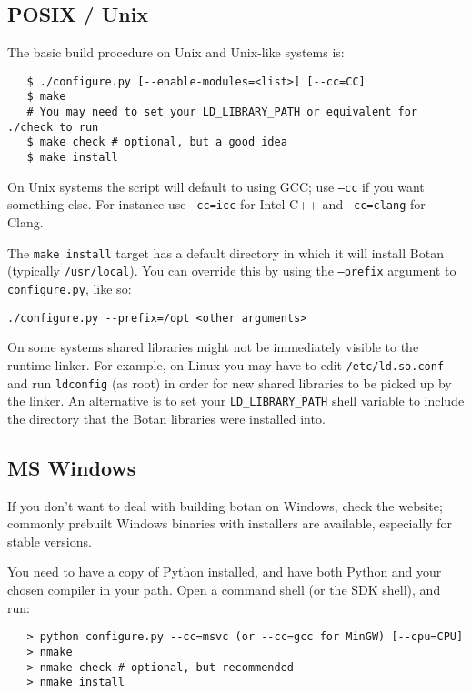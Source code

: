 \documentclass{article}
\newcommand{\filename}[1]{\texttt{#1}}
\begin{document}
\subsection{POSIX / Unix}

The basic build procedure on Unix and Unix-like systems is:

\begin{verbatim}
   $ ./configure.py [--enable-modules=<list>] [--cc=CC]
   $ make
   # You may need to set your LD_LIBRARY_PATH or equivalent for ./check to run
   $ make check # optional, but a good idea
   $ make install
\end{verbatim}

On Unix systems the script will default to using GCC; use
\texttt{--cc} if you want something else. For instance use
\texttt{--cc=icc} for Intel C++ and \texttt{--cc=clang} for Clang.

The \verb|make install| target has a default directory in which it
will install Botan (typically \verb|/usr/local|). You can override
this by using the \texttt{--prefix} argument to
\filename{configure.py}, like so:

\verb|./configure.py --prefix=/opt <other arguments>|

On some systems shared libraries might not be immediately visible to
the runtime linker. For example, on Linux you may have to edit
\filename{/etc/ld.so.conf} and run \texttt{ldconfig} (as root) in
order for new shared libraries to be picked up by the linker. An
alternative is to set your \texttt{LD\_LIBRARY\_PATH} shell variable
to include the directory that the Botan libraries were installed into.

\subsection{MS Windows}

If you don't want to deal with building botan on Windows, check the
website; commonly prebuilt Windows binaries with installers are
available, especially for stable versions.

You need to have a copy of Python installed, and have both Python and
your chosen compiler in your path. Open a command shell (or the SDK
shell), and run:

\begin{verbatim}
   > python configure.py --cc=msvc (or --cc=gcc for MinGW) [--cpu=CPU]
   > nmake
   > nmake check # optional, but recommended
   > nmake install
\end{verbatim}
\end{document}
